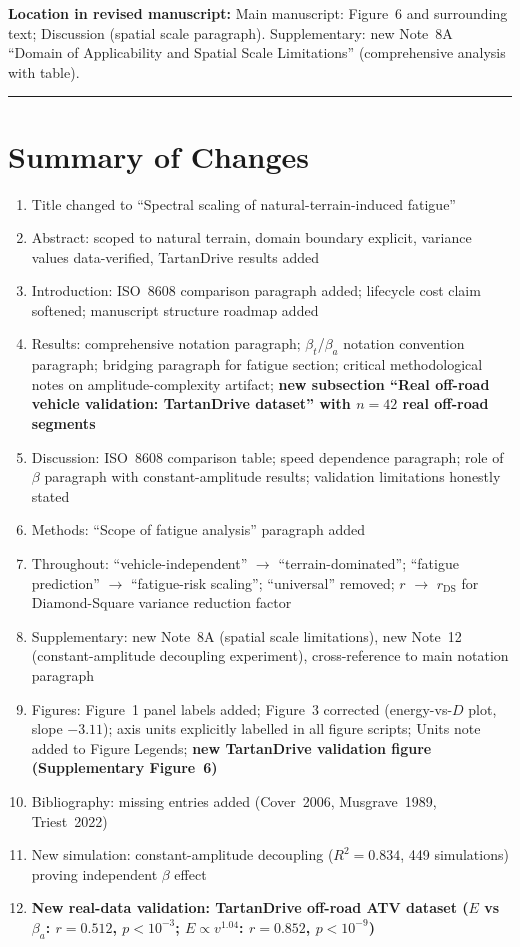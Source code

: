 \documentclass[11pt]{article}
\newcommand{\revloc}[1]{\noindent\textbf{Location in revised manuscript:} #1\medskip}
\begin{document}
\revloc{Main manuscript: Figure~6 and surrounding text; Discussion (spatial scale paragraph). Supplementary: new Note~8A ``Domain of Applicability and Spatial Scale Limitations'' (comprehensive analysis with table).}


\bigskip\noindent\rule{\textwidth}{0.4pt}

\section*{Summary of Changes}

\begin{enumerate}[leftmargin=*]
\item Title changed to ``Spectral scaling of natural-terrain-induced fatigue''
\item Abstract: scoped to natural terrain, domain boundary explicit, variance values data-verified, TartanDrive results added
\item Introduction: ISO~8608 comparison paragraph added; lifecycle cost claim softened; manuscript structure roadmap added
\item Results: comprehensive notation paragraph; $\beta_t$/$\beta_a$ notation convention paragraph; bridging paragraph for fatigue section; critical methodological notes on amplitude-complexity artifact; \textbf{new subsection ``Real off-road vehicle validation: TartanDrive dataset'' with $n=42$ real off-road segments}
\item Discussion: ISO~8608 comparison table; speed dependence paragraph; role of $\beta$ paragraph with constant-amplitude results; validation limitations honestly stated
\item Methods: ``Scope of fatigue analysis'' paragraph added
\item Throughout: ``vehicle-independent'' $\rightarrow$ ``terrain-dominated''; ``fatigue prediction'' $\rightarrow$ ``fatigue-risk scaling''; ``universal'' removed; $r$ $\rightarrow$ $r_{\text{DS}}$ for Diamond-Square variance reduction factor
\item Supplementary: new Note~8A (spatial scale limitations), new Note~12 (constant-amplitude decoupling experiment), cross-reference to main notation paragraph
\item Figures: Figure~1 panel labels added; Figure~3 corrected (energy-vs-$D$ plot, slope $-3.11$); axis units explicitly labelled in all figure scripts; Units note added to Figure Legends; \textbf{new TartanDrive validation figure (Supplementary Figure~6)}
\item Bibliography: missing entries added (Cover~2006, Musgrave~1989, Triest~2022)
\item New simulation: constant-amplitude decoupling ($R^2 = 0.834$, 449 simulations) proving independent $\beta$ effect
\item \textbf{New real-data validation: TartanDrive off-road ATV dataset ($E$ vs $\beta_a$: $r=0.512$, $p<10^{-3}$; $E \propto v^{1.04}$: $r=0.852$, $p<10^{-9}$)}
\end{enumerate}
\end{document}
